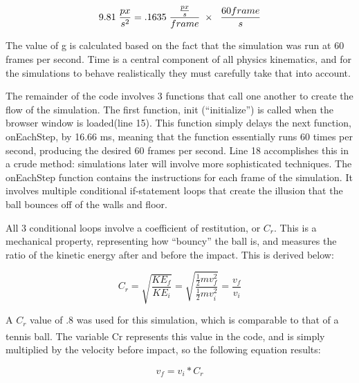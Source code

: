 \begin{equation} \label{eq:pixelsconversion}
9.81 \hspace{1mm}  \frac{px}{s^2}  = .1635 \hspace{1mm}  \frac{\frac{px}{s}}{frame} \hspace{1mm}  \times \hspace{1mm}  \hspace{1mm}  \frac{60 frame}{s}
\end{equation}


The value of g is calculated based on the fact that the simulation was run at 60 frames per second.  Time is a central component of all physics kinematics, and for the simulations to behave realistically they must carefully take that into account.  

The remainder of the code involves 3 functions that call one another to create the flow of the simulation.  The first function, init (``initialize'') is called when the browser window is loaded(line 15).  This function simply delays the next function, onEachStep, by 16.66 ms, meaning that the function essentially runs 60 times per second, producing the desired 60 frames per second.  Line 18 accomplishes this in a crude method: simulations later will involve more sophisticated techniques.  The onEachStep function contains the instructions for each frame of the simulation.  It involves multiple conditional if-statement loops that create the illusion that the ball bounces off of the walls and floor.  

All 3 conditional loops involve a coefficient of restitution, or $C_r$.  This is a mechanical property, representing how ``bouncy'' the ball is, and measures the ratio of the kinetic energy after and before the impact.  This is derived below:

\begin{equation}\label{eq:cr}
C_r = \sqrt{\frac{KE_f}{KE_i}} = \sqrt{\frac{\frac{1}{2} mv_f^2}{\frac{1}{2} mv_i^2}} = \frac{v_f}{v_i}
\end{equation}

A $C_r$ value of .8 was used for this simulation, which is comparable to that of a tennis ball\textsuperscript{\cite{tennisball}}.  The variable Cr represents this value in the code, and is simply multiplied by the velocity before impact, so the following equation results:

\begin{equation}\label{eq:velocitycr}
v_f = v_i * C_r
\end{equation}

